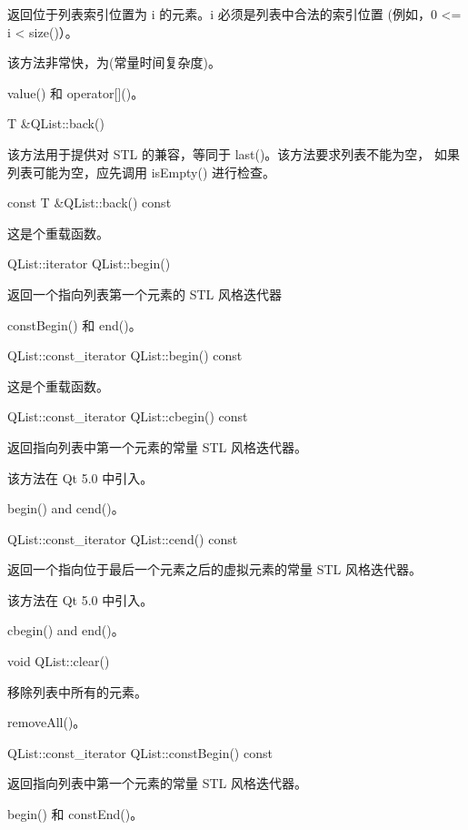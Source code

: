 返回位于列表索引位置为 i 的元素。i 必须是列表中合法的索引位置 (例如，0 <= i < size()）。

该方法非常快，为(常量时间复杂度)。

\begin{seeAlso}
value() 和 operator[]()。
\end{seeAlso}

T \&QList::back()

该方法用于提供对 STL 的兼容，等同于 last()。该方法要求列表不能为空， 如果列表可能为空，应先调用 isEmpty() 进行检查。

const T \&QList::back() const

这是个重载函数。

QList::iterator QList::begin()

返回一个指向列表第一个元素的 STL 风格迭代器


\begin{seeAlso}
constBegin() 和 end()。
\end{seeAlso}


QList::const\_iterator QList::begin() const

这是个重载函数。

QList::const\_iterator QList::cbegin() const

返回指向列表中第一个元素的常量 STL 风格迭代器。

该方法在 Qt 5.0 中引入。


\begin{seeAlso}
begin() and cend()。
\end{seeAlso}


QList::const\_iterator QList::cend() const

返回一个指向位于最后一个元素之后的虚拟元素的常量 STL 风格迭代器。

该方法在 Qt 5.0 中引入。


\begin{seeAlso}
cbegin() and end()。
\end{seeAlso}

void QList::clear()

移除列表中所有的元素。



\begin{seeAlso}
removeAll()。
\end{seeAlso}


QList::const\_iterator QList::constBegin() const

返回指向列表中第一个元素的常量 STL 风格迭代器。


\begin{seeAlso}
begin() 和 constEnd()。
\end{seeAlso}


